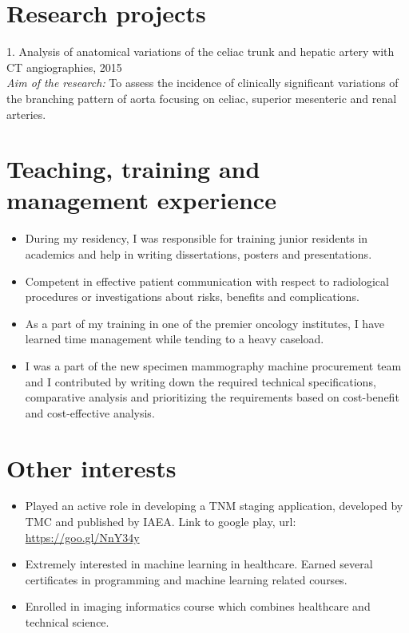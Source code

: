 \documentclass[a4paper,10pt]{article}
\begin{document}
\section{Research projects}
1. Analysis of anatomical variations of the celiac trunk and hepatic artery with CT angiographies, 2015\\
\textit{Aim of the research:} To assess the incidence of clinically significant variations of the branching pattern of aorta focusing on celiac, superior mesenteric and renal arteries.\\

\section{Teaching, training and management experience}
\begin{itemize}
  \item During my residency, I was responsible for training junior residents in academics and help in writing dissertations, posters and presentations.
  \vspace{-0.2cm}\item Competent in effective patient communication with respect to radiological procedures or investigations about risks, benefits and complications.
  \vspace{-0.2cm}\item As a part of my training in one of the premier oncology institutes, I have learned time management while tending to a heavy caseload.
  \vspace{-0.2cm}\item I was a part of the new specimen mammography machine procurement team and I contributed by writing down the required technical specifications, comparative analysis and prioritizing the requirements based on cost-benefit and cost-effective analysis.
\end{itemize}

\section{Other interests}
\begin{itemize}
  \item Played an active role in developing a TNM staging application, developed by TMC and published by IAEA. Link to google play, url: \url{https://goo.gl/NnY34y}
  \vspace{-0.2cm}\item Extremely interested in machine learning in healthcare. Earned several certificates in programming and machine learning related courses.
  \vspace{-0.2cm}\item Enrolled in imaging informatics course which combines healthcare and technical science.
\end{itemize}
\end{document}

